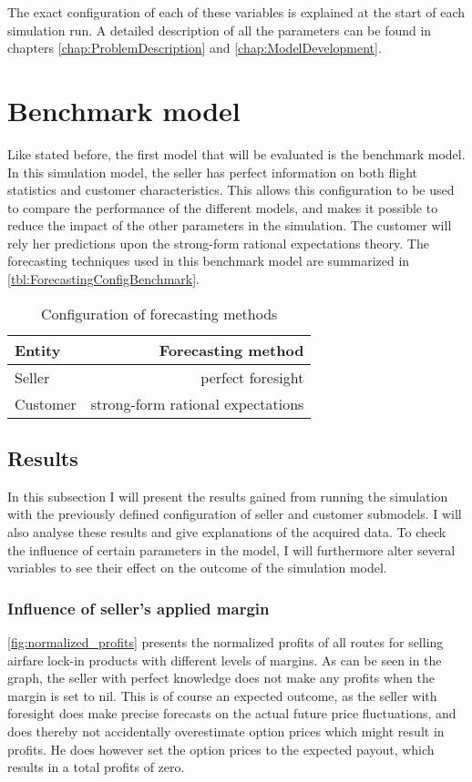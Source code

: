The exact configuration of each of these variables is explained at the start of each simulation run. A detailed description of all the parameters can be found in chapters \ref{chap:ProblemDescription} and \ref{chap:ModelDevelopment}.



\section{Benchmark model}
Like stated before, the first model that will be evaluated is the benchmark model. In this simulation model, the seller has perfect information on both flight statistics and customer characteristics. This allows this configuration to be used to compare the performance of the different models, and makes it possible to reduce the impact of the other parameters in the simulation. The customer will rely her predictions upon the strong-form rational expectations theory. The forecasting techniques used in this benchmark model are summarized in \autoref{tbl:ForecastingConfigBenchmark}.

\begin{table}
    \centering
    \begin{tabular}{l  r}
    \toprule
    Entity      &  Forecasting method \\
    \midrule
    Seller    &  perfect foresight  \\
    Customer  &  strong-form rational expectations \\
    \bottomrule
    \end{tabular}
    \caption{Configuration of forecasting methods}
    \label{tbl:ForecastingConfigBenchmark}
\end{table}


\subsection{Results}
In this subsection I will present the results gained from running the simulation with the previously defined configuration of seller and customer submodels. I will also analyse these results and give explanations of the acquired data. To check the influence of certain parameters in the model, I will furthermore alter several variables to see their effect on the outcome of the simulation model.

\subsubsection{Influence of seller's applied margin}
\autoref{fig:normalized_profits} presents the normalized profits of all routes for selling airfare lock-in products with different levels of margins. As can be seen in the graph, the seller with perfect knowledge does not make any profits when the margin is set to nil. This is of course an expected outcome, as the seller with foresight does make precise forecasts on the actual future price fluctuations, and does thereby not accidentally overestimate option prices which might result in profits. He does however set the option prices to the expected payout, which results in a total profits of zero.

